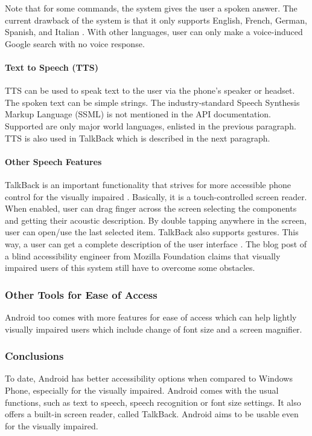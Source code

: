 Note that for some commands, the system gives the user a spoken answer. The current drawback of the system is that it only supports English, French, German, Spanish, and Italian \cite{androidTTS}. With other languages, user can only make a voice-induced Google search with no voice response.

\paragraph{Text to Speech (TTS)}
TTS can be used to speak text to the user via the phone's speaker or headset. The spoken text can be simple strings. The industry-standard Speech Synthesis Markup Language (SSML) is not mentioned in the API documentation. Supported are only major world languages, enlisted in the previous paragraph. TTS is also used in TalkBack which is described in the next paragraph.

\paragraph{Other Speech Features}
TalkBack is an important functionality that strives for more accessible phone control for the visually impaired \cite{androidAccbility}. Basically, it is a touch-controlled screen reader. When enabled, user can drag finger across the screen selecting the components and getting their acoustic description. By double tapping anywhere in the screen, user can open/use the last selected item. TalkBack also supports gestures. This way, a user can get a complete description of the user interface \cite{androidAccbility}. The blog post of a blind accessibility engineer from Mozilla Foundation \cite{mozillaguy} claims that visually impaired users of this system still have to overcome some obstacles.

\subsubsection{Other Tools for Ease of Access}
Android too comes with more features for ease of access which can help lightly visually impaired users which include change of font size and a screen magnifier.

\subsubsection{Conclusions}
To date, Android has better accessibility options when compared to Windows Phone, especially for the visually impaired. Android comes with the usual functions, such as text to speech, speech recognition or font size settings. It also offers a built-in screen reader, called TalkBack. Android aims to be usable even for the visually impaired.





